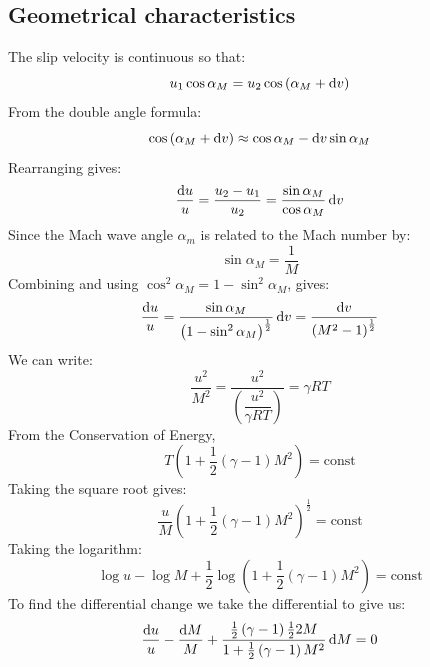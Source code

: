 \subsection{Geometrical characteristics}
The slip velocity is continuous so that:
\begin{equation}
    u_1 \cos \alpha_M = u_2 \cos\left(\alpha_M + \dif v\right)
\end{equation}
From the double angle formula:
\begin{equation}
    \cos \left(\alpha_M + \dif v \right) \approx \cos \alpha_M - \dif v \sin\alpha_M
\end{equation}
Rearranging gives:
\begin{equation}
    \frac{\dif u}{u} = \frac{u_2 - u_1}{u_2} = \frac{\sin\alpha_M}{\cos \alpha_M} \dif v
\end{equation}
Since the Mach wave angle $\alpha_m$ is related to the Mach number by:
\begin{equation}
    \sin\alpha_M = \frac{1}{M}
\end{equation}
Combining and using $\cos^2\alpha_M = 1 - \sin^2\alpha_M$, gives:
\begin{equation}
    \frac{\dif u }{u} = \frac{\sin \alpha_M}{\left(1 - \sin^2\alpha_M\right)^{\frac{1}{2}}}\dif v = \frac{\dif v}{\left(M^2 - 1\right)^{\frac{1}{2}}}
\end{equation}
We can write:
\begin{equation}
    \frac{u^2}{M^2} = \frac{u^2}{\left(\dfrac{u^2}{\gamma RT}\right)} = \gamma RT
\end{equation}
From the Conservation of Energy,
\begin{equation}
    T\left(1 + \frac{1}{2}\left(\gamma - 1\right)M^2\right) = \textrm{const}
\end{equation}
Taking the square root gives:
\begin{equation}
    \frac{u}{M}\left(1 + \frac{1}{2}\left(\gamma -1 \right)M^2\right)^{\frac{1}{2}} = \textrm{const}
\end{equation}
Taking the logarithm:
\begin{equation}
    \log u - \log M + \frac{1}{2}\log \left(1 + \frac{1}{2}\left(\gamma - 1\right)M^2\right) = \textrm{const}
\end{equation}
To find the differential change we take the differential to give us:
\begin{equation}
    \frac{\dif u}{u} - \frac{\dif M}{M} + \frac{\frac{1}{2}\left(\gamma - 1\right)\frac{1}{2}2M}{1 + \frac{1}{2}\left(\gamma - 1\right)M^2}\dif M = 0
\end{equation}
